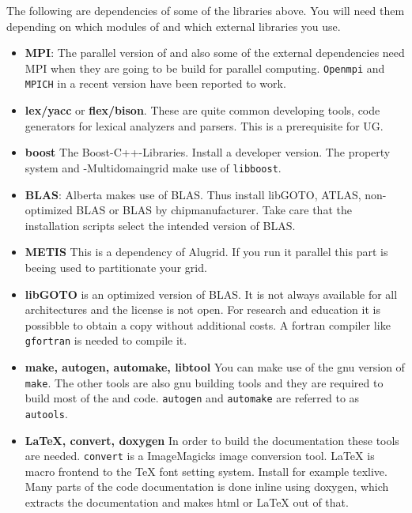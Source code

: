 The following are dependencies of some of the libraries above. You will need them depending on which modules of \Dune and which external libraries you use.
\begin{itemize}
\item \textbf{MPI}: The parallel version of \Dune and also some of the external dependencies need MPI when they are going to be build for parallel computing. \texttt{Openmpi} and \texttt{MPICH} in a recent version have been reported to work. 

\item \textbf{lex/yacc} or \textbf{flex/bison}. These are quite common developing tools, code generators for lexical analyzers and parsers. This is a prerequisite for UG.

\item \textbf{boost} The Boost-C++-Libraries. Install a developer version. The \Dumux property system and \Dune-Multidomaingrid make use of \texttt{libboost}.

\item \textbf{BLAS}: Alberta makes use of BLAS. Thus install libGOTO, ATLAS, non-optimized BLAS or BLAS by chipmanufacturer. Take care that the installation scripts select the intended version of BLAS. 

\item \textbf{METIS} This is a dependency of Alugrid. If you run it parallel this part is beeing used to partitionate your grid.

\item \textbf{libGOTO} is an optimized version of BLAS. It is not always available for all architectures and 
the license is not open. For research and education it is possibble to obtain a copy without additional costs.
A fortran compiler like \texttt{gfortran} is needed to compile it.

\item \textbf{make, autogen, automake, libtool} 
You can make use of the gnu version of \texttt{make}. The other tools are also gnu building tools and they are required to build most of the \Dune and \Dumux code. \texttt{autogen} and \texttt{automake} are referred to as \texttt{autools}. 

\item \textbf{LaTeX, convert, doxygen} In order to build the \Dumux documentation these tools are needed. 
\texttt{convert} is a ImageMagicks image conversion tool. LaTeX is macro frontend to the TeX font setting system. Install for example texlive. Many parts of the code documentation is done inline using doxygen, which extracts the documentation and makes html or LaTeX out of that.


\end{itemize}
